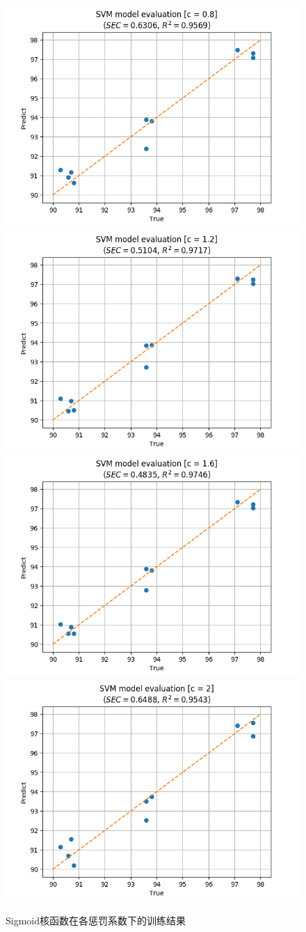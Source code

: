 \documentclass[a4paper, 12pt]{article}
\begin{document}
			\begin{figure}
				\centering
				\begin{minipage}{0.85\linewidth}
					\includegraphics[width=0.5\linewidth]{../img/svm_result_t3_c0_8}
					\includegraphics[width=0.5\linewidth]{../img/svm_result_t3_c1_2}
					\includegraphics[width=0.5\linewidth]{../img/svm_result_t3_c1_6}
					\includegraphics[width=0.5\linewidth]{../img/svm_result_t3_c2}
				\end{minipage}
				\caption{Sigmoid核函数在各惩罚系数下的训练结果}
				\label{fig:svm_result_c}
			\end{figure}
			
\end{document}
